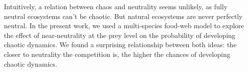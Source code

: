 Intuitively, a relation between chaos and neutrality seems unlikely, as fully neutral ecosystems can't be chaotic. But natural ecosystems are never perfectly neutral. In the present work, we used a multi-species food-web model to explore the effect of near-neutrality at the prey level on the probability of developing chaotic dynamics. We found a surprising relationship between both ideas: the closer to neutrality the competition is, the higher the chances of developing chaotic dynamics.
